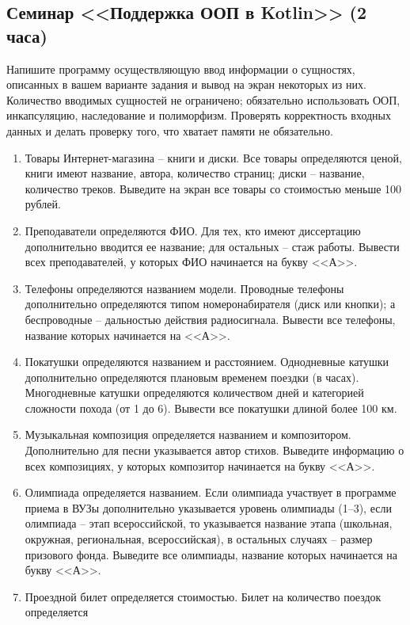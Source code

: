 \subsection{Семинар <<Поддержка ООП в Kotlin>> (2 часа)} 


Напишите программу осуществляющую ввод информации о сущностях, описанных в вашем варианте задания и вывод на экран
некоторых из них. Количество вводимых сущностей не ограничено; обязательно использовать
ООП, инкапсуляцию, наследование и полиморфизм. Проверять корректность входных данных и делать проверку того,
что хватает памяти не обязательно. 

\begin{enumerate}
\item Товары Интернет-магазина -- книги и диски. Все товары определяются ценой, книги имеют название,
автора, количество страниц; диски -- название, количество треков.
 Выведите на экран все товары со стоимостью меньше 100 рублей.
\item Преподаватели определяются ФИО. Для тех, кто имеют диссертацию дополнительно вводится ее название;
для остальных -- стаж работы. Вывести всех преподавателей, у которых ФИО начинается на букву <<А>>.
\item Телефоны определяются названием модели. Проводные телефоны дополнительно определяются типом номеронабирателя
(диск или кнопки); а беспроводные -- дальностью действия радиосигнала.
Вывести все телефоны, название которых начинается на <<А>>.
\item Покатушки определяются названием и расстоянием. Однодневные катушки дополнительно определяются
плановым временем поездки (в часах). Многодневные катушки определяются количеством дней и категорией сложности
похода (от 1 до 6). Вывести все покатушки длиной более 100 км.
\item Музыкальная композиция определяется названием и композитором. Дополнительно для песни указывается
автор стихов. Выведите информацию о всех композициях, у которых композитор начинается на букву <<А>>.
\item Олимпиада определяется названием. Если олимпиада участвует в программе приема в ВУЗы дополнительно
указывается уровень олимпиады (1--3), если олимпиада -- этап всероссийской, то указывается название этапа
(школьная, окружная, региональная, всероссийская), в остальных случаях -- размер призового фонда.
Выведите все олимпиады, название которых начинается на букву <<А>>.
\item Проездной билет определяется стоимостью. Билет на количество поездок определяется 

\end{enumerate}
